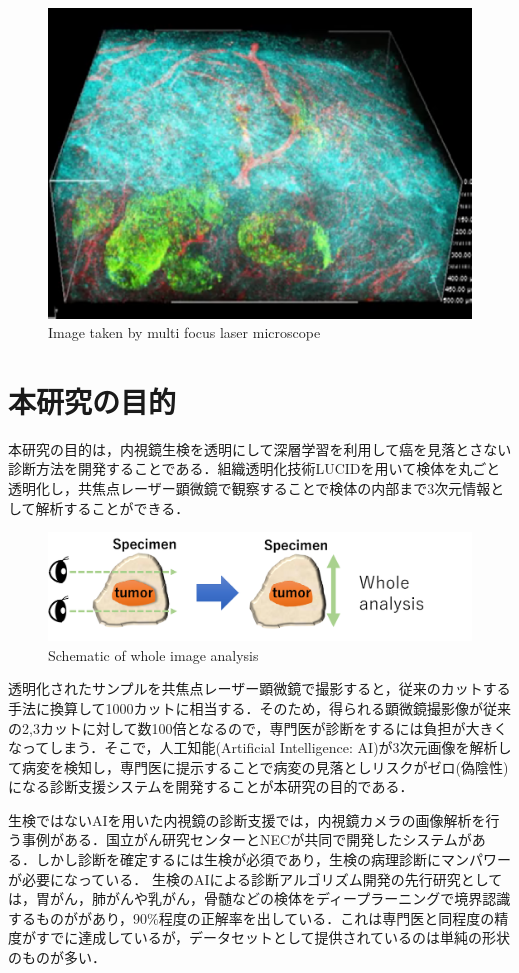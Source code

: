 \begin{figure}[H]
	\centering
	\includegraphics[width=0.7\linewidth]{fig/chapter1/microscope}
	\caption{Image taken by multi focus laser microscope}
	\label{fig:microscope}
\end{figure}


\section{本研究の目的}
本研究の目的は，内視鏡生検を透明にして深層学習を利用して癌を見落とさない診断方法を開発することである．組織透明化技術LUCIDを用いて検体を丸ごと透明化し，共焦点レーザー顕微鏡で観察することで検体の内部まで3次元情報として解析することができる．

\begin{figure}[H]
	\centering
	\includegraphics[width=0.7\linewidth]{fig/chapter1/whole_image_analysis}
	\caption{Schematic of whole image analysis}
	\label{fig:wholeimageanalysis}
\end{figure}

透明化されたサンプルを共焦点レーザー顕微鏡で撮影すると，従来のカットする手法に換算して1000カットに相当する．そのため，得られる顕微鏡撮影像が従来の2,3カットに対して数100倍となるので，専門医が診断をするには負担が大きくなってしまう．そこで，人工知能(Artificial Intelligence: AI)が3次元画像を解析して病変を検知し，専門医に提示することで病変の見落としリスクがゼロ(偽陰性)になる診断支援システムを開発することが本研究の目的である．


生検ではないAIを用いた内視鏡の診断支援では，内視鏡カメラの画像解析を行う事例がある．国立がん研究センターとNECが共同で開発したシステムがある\cite{要出典}．しかし診断を確定するには生検が必須であり，生検の病理診断にマンパワーが必要になっている．
生検のAIによる診断アルゴリズム開発の先行研究としては，胃がん，肺がんや乳がん，骨髄などの検体をディープラーニングで境界認識するものががあり，90\%程度の正解率を出している\cite{要出典}．これは専門医と同程度の精度がすでに達成しているが，データセットとして提供されているのは単純の形状のものが多い．

